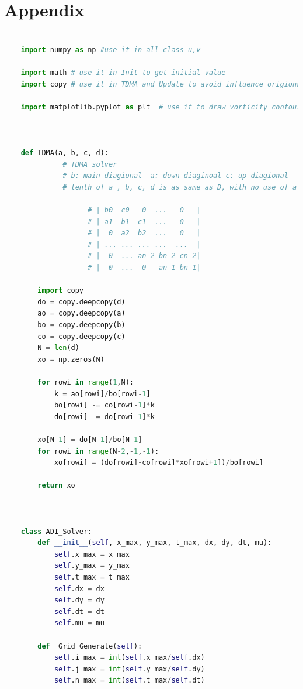 \documentclass[12pt]{article}
\begin{document}
\section*{Appendix}
\begin{scriptsize}

\begin{lstlisting}[language=python,caption={ADI Solver}]

    import numpy as np #use it in all class u,v

    import math # use it in Init to get initial value
    import copy # use it in TDMA and Update to avoid influence origional data
    
    import matplotlib.pyplot as plt  # use it to draw vorticity contour
    
    
    
    def TDMA(a, b, c, d):  
              # TDMA solver 
              # b: main diagional  a: down diaginoal c: up diagional 
              # lenth of a , b, c, d is as same as D, with no use of a[0], a[max], c[0], c[max]
               
                    # | b0  c0   0  ...   0   |
                    # | a1  b1  c1  ...   0   |
                    # |  0  a2  b2  ...   0   |
                    # | ... ... ... ...  ...  |
                    # |  0  ... an-2 bn-2 cn-2|
                    # |  0  ...  0   an-1 bn-1|
    
        import copy
        do = copy.deepcopy(d)
        ao = copy.deepcopy(a)
        bo = copy.deepcopy(b)
        co = copy.deepcopy(c)
        N = len(d)
        xo = np.zeros(N)
        
        for rowi in range(1,N):
            k = ao[rowi]/bo[rowi-1]
            bo[rowi] -= co[rowi-1]*k
            do[rowi] -= do[rowi-1]*k
        
        xo[N-1] = do[N-1]/bo[N-1]
        for rowi in range(N-2,-1,-1):
            xo[rowi] = (do[rowi]-co[rowi]*xo[rowi+1])/bo[rowi]
    
        return xo
    
    
    
    class ADI_Solver:
        def __init__(self, x_max, y_max, t_max, dx, dy, dt, mu):
            self.x_max = x_max
            self.y_max = y_max
            self.t_max = t_max
            self.dx = dx
            self.dy = dy
            self.dt = dt
            self.mu = mu
    
        def  Grid_Generate(self):
            self.i_max = int(self.x_max/self.dx)
            self.j_max = int(self.y_max/self.dy)
            self.n_max = int(self.t_max/self.dt)
    

\end{lstlisting}
\end{scriptsize}
\end{document}
